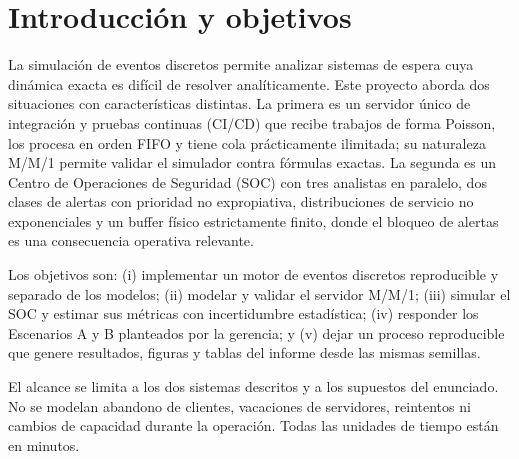 \section{Introducción y objetivos}

La simulación de eventos discretos permite analizar sistemas de espera cuya
dinámica exacta es difícil de resolver analíticamente. Este proyecto aborda dos
situaciones con características distintas. La primera es un servidor único de
integración y pruebas continuas (CI/CD) que recibe trabajos de forma Poisson,
los procesa en orden FIFO y tiene cola prácticamente ilimitada; su naturaleza
M/M/1 permite validar el simulador contra fórmulas exactas. La segunda es un
Centro de Operaciones de Seguridad (SOC) con tres analistas en paralelo, dos
clases de alertas con prioridad no expropiativa, distribuciones de servicio no
exponenciales y un buffer físico estrictamente finito, donde el bloqueo de
alertas es una consecuencia operativa relevante.

Los objetivos son: (i) implementar un motor de eventos discretos reproducible y
separado de los modelos; (ii) modelar y validar el servidor M/M/1; (iii)
simular el SOC y estimar sus métricas con incertidumbre estadística; (iv)
responder los Escenarios A y B planteados por la gerencia; y (v) dejar un
proceso reproducible que genere resultados, figuras y tablas del informe desde
las mismas semillas.

El alcance se limita a los dos sistemas descritos y a los supuestos del
enunciado. No se modelan abandono de clientes, vacaciones de servidores,
reintentos ni cambios de capacidad durante la operación. Todas las unidades de
tiempo están en minutos.
